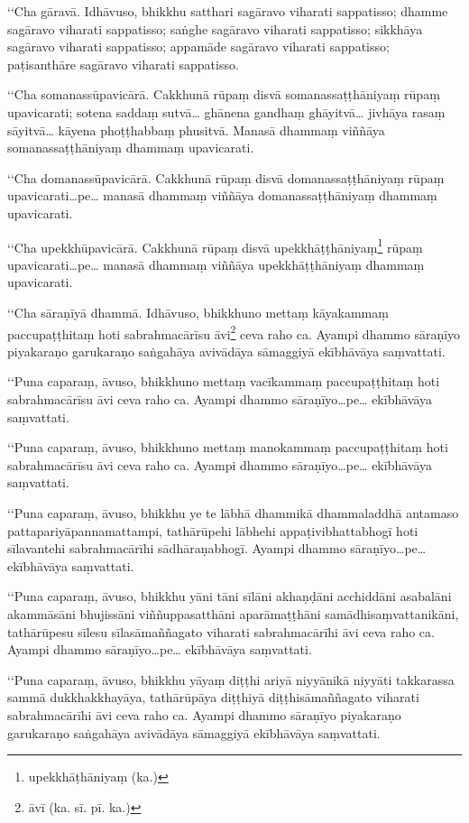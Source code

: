 ‘‘Cha gāravā. Idhāvuso, bhikkhu satthari sagāravo viharati sappatisso; dhamme sagāravo viharati sappatisso; saṅghe sagāravo viharati sappatisso; sikkhāya sagāravo viharati sappatisso; appamāde sagāravo viharati sappatisso; paṭisanthāre sagāravo viharati sappatisso.

‘‘Cha somanassūpavicārā. Cakkhunā rūpaṃ disvā somanassaṭṭhāniyaṃ rūpaṃ upavicarati; sotena saddaṃ sutvā… ghānena gandhaṃ ghāyitvā… jivhāya rasaṃ sāyitvā… kāyena phoṭṭhabbaṃ phusitvā. Manasā dhammaṃ viññāya somanassaṭṭhāniyaṃ dhammaṃ upavicarati.

‘‘Cha domanassūpavicārā. Cakkhunā rūpaṃ disvā domanassaṭṭhāniyaṃ rūpaṃ upavicarati…pe… manasā dhammaṃ viññāya domanassaṭṭhāniyaṃ dhammaṃ upavicarati.

‘‘Cha upekkhūpavicārā. Cakkhunā rūpaṃ disvā upekkhāṭṭhāniyaṃ\footnote{upekkhāṭhāniyaṃ (ka.)} rūpaṃ upavicarati…pe… manasā dhammaṃ viññāya upekkhāṭṭhāniyaṃ dhammaṃ upavicarati.

‘‘Cha sāraṇīyā dhammā. Idhāvuso, bhikkhuno mettaṃ kāyakammaṃ paccupaṭṭhitaṃ hoti sabrahmacārīsu āvi\footnote{āvī (ka. sī. pī. ka.)} ceva raho ca. Ayampi dhammo sāraṇīyo piyakaraṇo garukaraṇo saṅgahāya avivādāya sāmaggiyā ekībhāvāya saṃvattati.

‘‘Puna caparaṃ, āvuso, bhikkhuno mettaṃ vacīkammaṃ paccupaṭṭhitaṃ hoti sabrahmacārīsu āvi ceva raho ca. Ayampi dhammo sāraṇīyo…pe… ekībhāvāya saṃvattati.

‘‘Puna caparaṃ, āvuso, bhikkhuno mettaṃ manokammaṃ paccupaṭṭhitaṃ hoti sabrahmacārīsu āvi ceva raho ca. Ayampi dhammo sāraṇīyo…pe… ekībhāvāya saṃvattati.

‘‘Puna caparaṃ, āvuso, bhikkhu ye te lābhā dhammikā dhammaladdhā antamaso pattapariyāpannamattampi, tathārūpehi lābhehi appaṭivibhattabhogī hoti sīlavantehi sabrahmacārīhi sādhāraṇabhogī. Ayampi dhammo sāraṇīyo…pe… ekībhāvāya saṃvattati.

‘‘Puna caparaṃ, āvuso, bhikkhu yāni tāni sīlāni akhaṇḍāni acchiddāni asabalāni akammāsāni bhujissāni viññuppasatthāni aparāmaṭṭhāni samādhisaṃvattanikāni, tathārūpesu sīlesu sīlasāmaññagato viharati sabrahmacārīhi āvi ceva raho ca. Ayampi dhammo sāraṇīyo…pe… ekībhāvāya saṃvattati.

‘‘Puna caparaṃ, āvuso, bhikkhu yāyaṃ diṭṭhi ariyā niyyānikā niyyāti takkarassa sammā dukkhakkhayāya, tathārūpāya diṭṭhiyā diṭṭhisāmaññagato viharati sabrahmacārīhi āvi ceva raho ca. Ayampi dhammo sāraṇīyo piyakaraṇo garukaraṇo saṅgahāya avivādāya sāmaggiyā ekībhāvāya saṃvattati.

